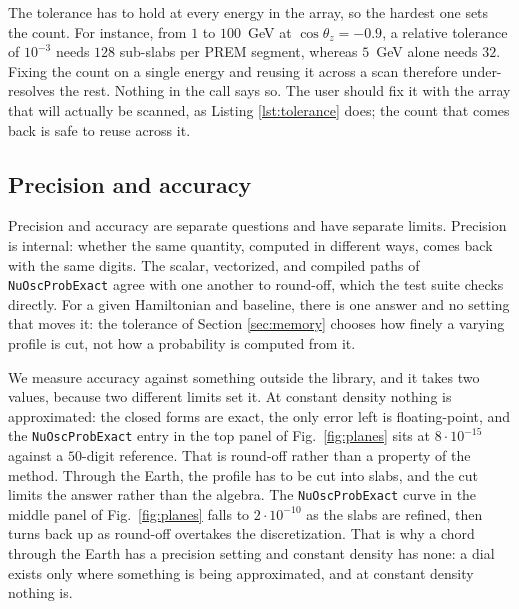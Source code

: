 \documentclass[final,5p,times,twocolumn,sort,compress]{elsarticle}
\newcommand{\fig}{Fig.}
\newcommand{\figu}[1]{\fig~\ref{fig:#1}}
\begin{document}
The tolerance has to hold at every energy in the array, so the hardest one sets the count.  For instance, from $1$ to $100$~GeV at $\cos\theta_z = -0.9$, a relative tolerance of $10^{-3}$ needs $128$ sub-slabs per PREM segment, whereas $5$~GeV alone needs $32$.  Fixing the count on a single energy and reusing it across a scan therefore under-resolves the rest.  Nothing in the call says so.  The user should fix it with the array that will actually be scanned, as Listing \ref{lst:tolerance} does; the count that comes back is safe to reuse across it.


\subsection{Precision and accuracy}
\label{sec:precision}

Precision and accuracy are separate questions and have separate limits.  Precision is internal: whether the same quantity, computed in different ways, comes back with the same digits.  The scalar, vectorized, and compiled paths of {\tt NuOscProbExact} agree with one another to round-off, which the test suite checks directly.  For a given Hamiltonian and baseline, there is one answer and no setting that moves it: the tolerance of Section \ref{sec:memory} chooses how finely a varying profile is cut, not how a probability is computed from it.

We measure accuracy against something outside the library, and it takes two values, because two different limits set it.  At constant density nothing is approximated: the closed forms are exact, the only error left is floating-point, and the {\tt NuOscProbExact} entry in the top panel of \figu{planes} sits at $8 \cdot 10^{-15}$ against a $50$-digit reference.  That is round-off rather than a property of the method.  Through the Earth, the profile has to be cut into slabs, and the cut limits the answer rather than the algebra.  The {\tt NuOscProbExact} curve in the middle panel of \figu{planes} falls to $2 \cdot 10^{-10}$ as the slabs are refined, then turns back up as round-off overtakes the discretization.  That is why a chord through the Earth has a precision setting and constant density has none: a dial exists only where something is being approximated, and at constant density nothing is.
\end{document}
